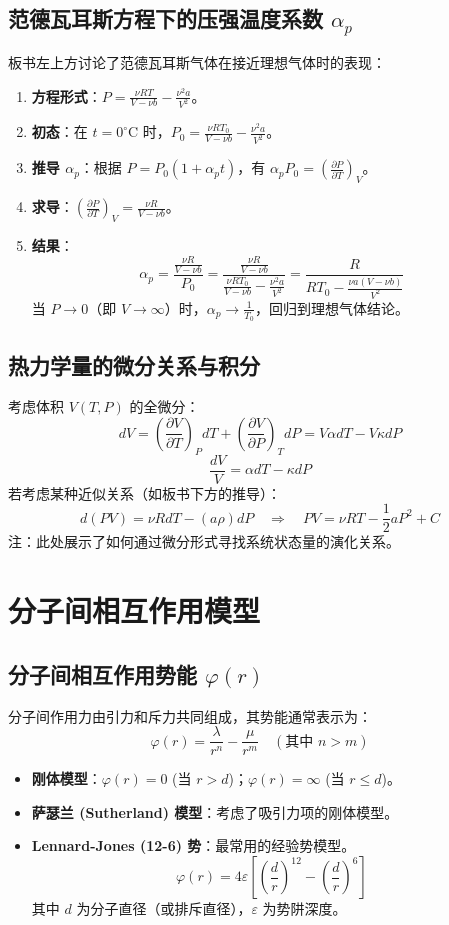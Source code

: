\documentclass{article}
\begin{document}
\subsection{范德瓦耳斯方程下的压强温度系数 $\alpha_p$}
板书左上方讨论了范德瓦耳斯气体在接近理想气体时的表现：
\begin{enumerate}
    \item \textbf{方程形式}：$P = \frac{\nu RT}{V - \nu b} - \frac{\nu^2 a}{V^2}$。
    \item \textbf{初态}：在 $t=0^\circ\text{C}$ 时，$P_0 = \frac{\nu R T_0}{V - \nu b} - \frac{\nu^2 a}{V^2}$。
    \item \textbf{推导 $\alpha_p$}：根据 $P = P_0(1 + \alpha_p t)$，有 $\alpha_p P_0 = \left( \frac{\partial P}{\partial T} \right)_V$。
    \item \textbf{求导}：$\left( \frac{\partial P}{\partial T} \right)_V = \frac{\nu R}{V - \nu b}$。
    \item \textbf{结果}：
    \[ \alpha_p = \frac{\frac{\nu R}{V - \nu b}}{P_0} = \frac{\frac{\nu R}{V - \nu b}}{\frac{\nu R T_0}{V - \nu b} - \frac{\nu^2 a}{V^2}} = \frac{R}{R T_0 - \frac{\nu a (V - \nu b)}{V^2}} \]
    当 $P \to 0$（即 $V \to \infty$）时，$\alpha_p \to \frac{1}{T_0}$，回归到理想气体结论。
\end{enumerate}

\subsection{热力学量的微分关系与积分}
考虑体积 $V(T, P)$ 的全微分：
\[ dV = \left( \frac{\partial V}{\partial T} \right)_P dT + \left( \frac{\partial V}{\partial P} \right)_T dP = V \alpha dT - V \kappa dP \]
\[ \frac{dV}{V} = \alpha dT - \kappa dP \]
若考虑某种近似关系（如板书下方的推导）：
\[ d(PV) = \nu R dT - (a \rho) dP \quad \Rightarrow \quad PV = \nu RT - \frac{1}{2} a P^2 + C \]
注：此处展示了如何通过微分形式寻找系统状态量的演化关系。

\section{分子间相互作用模型}

\subsection{分子间相互作用势能 $\varphi(r)$}
分子间作用力由引力和斥力共同组成，其势能通常表示为：
\[ \varphi(r) = \frac{\lambda}{r^n} - \frac{\mu}{r^m} \quad (\text{其中 } n > m) \]
\begin{itemize}
    \item \textbf{刚体模型}：$\varphi(r) = 0$ (当 $r > d$)；$\varphi(r) = \infty$ (当 $r \le d$)。
    \item \textbf{萨瑟兰 (Sutherland) 模型}：考虑了吸引力项的刚体模型。
    \item \textbf{Lennard-Jones (12-6) 势}：最常用的经验势模型。
    \[ \varphi(r) = 4\varepsilon \left[ \left( \frac{d}{r} \right)^{12} - \left( \frac{d}{r} \right)^6 \right] \]
    其中 $d$ 为分子直径（或排斥直径），$\varepsilon$ 为势阱深度。
\end{itemize}
\end{document}
